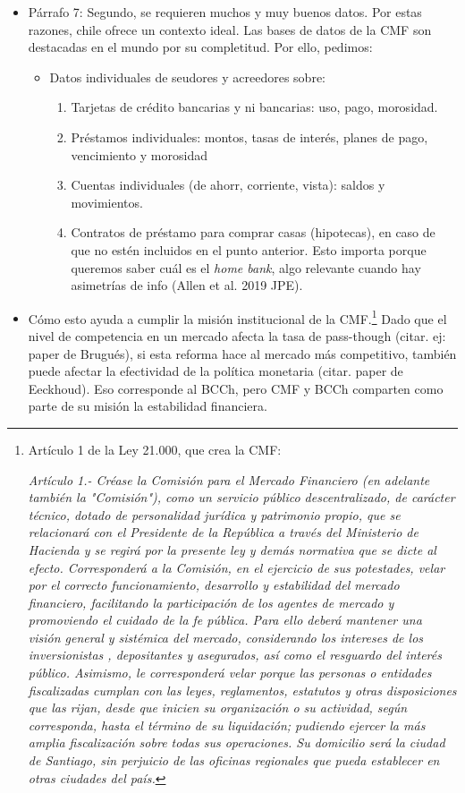 \documentclass[11pt]{article}
\theoremstyle{plain}
\theoremstyle{plain}
\begin{document}
\begin{itemize}
    \item Párrafo 7: Segundo, se requieren muchos y muy buenos datos. Por estas razones, chile ofrece un contexto ideal. Las bases de datos de la CMF son destacadas en el mundo por su completitud. Por ello, pedimos:
    \begin{itemize}
        \item Datos individuales de seudores y acreedores sobre:
        \begin{enumerate}
            \item Tarjetas de crédito bancarias y ni bancarias: uso, pago, morosidad.
            \item Préstamos individuales: montos, tasas de interés, planes de pago, vencimiento y morosidad
            \item Cuentas individuales (de ahorr, corriente, vista): saldos y movimientos.
            \item Contratos de préstamo para comprar casas (hipotecas), en caso de que no estén incluidos en el punto anterior. Esto importa porque queremos saber cuál es el \textit{home bank}, algo relevante cuando hay asimetrías de info (Allen et al. 2019 JPE). 
        \end{enumerate}
    \end{itemize}
    \item Cómo esto ayuda a cumplir la misión institucional de la CMF.\footnote{Artículo 1 de la Ley 21.000, que crea la CMF: 
    
    \textit{Artículo 1.- Créase la Comisión para el Mercado Financiero (en adelante también la "Comisión"), como un servicio público descentralizado, de carácter técnico, dotado de personalidad jurídica y patrimonio propio, que se relacionará con el Presidente de la República a través del Ministerio de Hacienda y se regirá por la presente ley y demás normativa que se dicte al efecto.
    Corresponderá a la Comisión, en el ejercicio de sus potestades, velar por el correcto funcionamiento, desarrollo y estabilidad del mercado financiero, facilitando la participación de los agentes de mercado y promoviendo el cuidado de la fe pública. Para ello deberá mantener una visión general y sistémica del mercado, considerando los intereses de los inversionistas
, depositantes y asegurados, así como el resguardo del interés público.
    Asimismo, le corresponderá velar porque las personas o entidades fiscalizadas cumplan con las leyes, reglamentos, estatutos y otras disposiciones que las rijan, desde que inicien su organización o su actividad, según corresponda, hasta el término de su liquidación; pudiendo ejercer la más amplia fiscalización sobre todas sus operaciones.
    Su domicilio será la ciudad de Santiago, sin perjuicio de las oficinas regionales que pueda establecer en otras ciudades del país.}} Dado que el nivel de competencia en un mercado afecta la tasa de pass-though (citar. ej: paper de Brugués), si esta reforma hace al mercado más competitivo, también puede afectar la efectividad de la política monetaria (citar. paper de Eeckhoud). Eso corresponde al BCCh, pero CMF y BCCh comparten como parte de su misión la estabilidad financiera.


\end{itemize}
\end{document}
